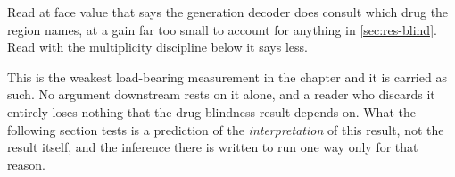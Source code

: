 Read at face value that says the generation decoder does consult which drug the
region names, at a gain far too small to account for anything in
\cref{sec:res-blind}. Read with the multiplicity discipline below it says less.

\begin{scopelimit}
This is the weakest load-bearing measurement in the chapter and it is carried as
such. No argument downstream rests on it alone, and a reader who discards it
entirely loses nothing that the drug-blindness result depends on. What the
following section tests is a prediction of the \emph{interpretation} of this
result, not the result itself, and the inference there is written to run one way
only for that reason.
\end{scopelimit}


